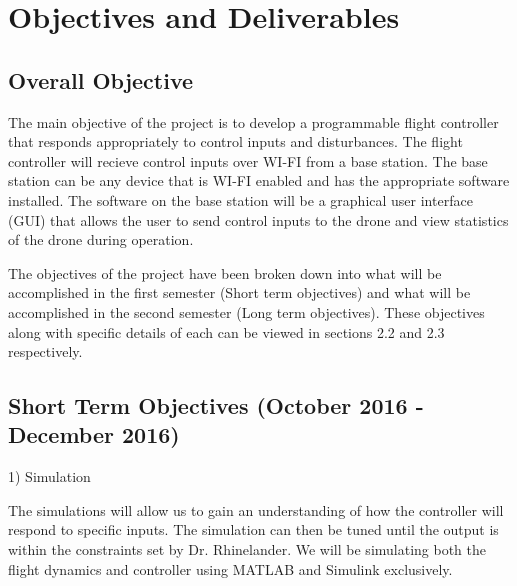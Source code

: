 \section{Objectives and Deliverables}
\subsection{Overall Objective}
The main objective of the project is to develop a programmable flight controller that responds appropriately to control inputs and disturbances. The flight controller will recieve control inputs over WI-FI from a base station. The base station can be any device that is WI-FI enabled and has the appropriate software installed. The software on the base station will be a graphical user interface (GUI) that allows the user to send control inputs to the drone and view statistics of the drone during operation. 

The objectives of the project have been broken down into what will be accomplished in the first semester (Short term objectives) and what will be accomplished in the second semester (Long term objectives). These objectives along with specific details of each can be viewed in sections 2.2 and 2.3 respectively.  

\subsection{Short Term Objectives (October 2016 - December 2016)}
1) Simulation

The simulations will allow us to gain an understanding of how the controller will respond to specific inputs. The simulation can then be tuned until the output is within the constraints set by Dr. Rhinelander. We will be simulating both the flight dynamics and controller using MATLAB and Simulink exclusively.  
	

